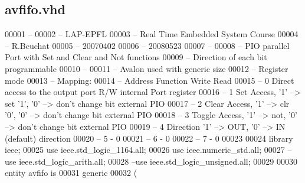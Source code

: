 \subsection{avfifo.\+vhd}
\label{ip_2avfifo_2avfifo_8vhd_source}

\begin{DoxyCode}
00001 \textcolor{keyword}{--}
00002 \textcolor{keyword}{-- LAP-EPFL}
00003 \textcolor{keyword}{-- Real Time Embedded System Course}
00004 \textcolor{keyword}{-- R.Beuchat}
00005 \textcolor{keyword}{-- 20070402}
00006 \textcolor{keyword}{-- 20080523}
00007 \textcolor{keyword}{--}
00008 \textcolor{keyword}{-- PIO parallel Port with Set and Clear and Not functions}
00009 \textcolor{keyword}{-- Direction of each bit programmable}
00010 \textcolor{keyword}{--}
00011 \textcolor{keyword}{-- Avalon used with generic size}
00012 \textcolor{keyword}{-- Register mode}
00013 \textcolor{keyword}{-- Mapping:}
00014 \textcolor{keyword}{-- Address  Function Write                                              Read}
00015 \textcolor{keyword}{-- 0        Direct access to the output port    R/W                     internal Port register}
00016 \textcolor{keyword}{-- 1        Set Access,    '1' --> set '1', '0' --> don't change bit    external PIO}
00017 \textcolor{keyword}{-- 2        Clear Access,  '1' --> clr '0', '0' --> don't change bit    external PIO}
00018 \textcolor{keyword}{-- 3        Toggle Access, '1' --> not,     '0' --> don't change bit    external PIO}
00019 \textcolor{keyword}{-- 4        Direction      '1' --> OUT,     '0' --> IN (default)        direction}
00020 \textcolor{keyword}{-- 5        -                                                           0}
00021 \textcolor{keyword}{-- 6        -                                                           0}
00022 \textcolor{keyword}{-- 7        -                                                           0}
00023 
00024 \textcolor{vhdlkeyword}{library }\textcolor{keywordflow}{ieee};
00025 \textcolor{vhdlkeyword}{use }ieee.std\_logic\_1164.\textcolor{keywordflow}{all};
00026 \textcolor{vhdlkeyword}{use }ieee.numeric\_std.\textcolor{keywordflow}{all};
00027 \textcolor{keyword}{--use ieee.std\_logic\_arith.all;}
00028 \textcolor{keyword}{--use ieee.std\_logic\_unsigned.all;}
00029 
00030 \textcolor{keywordflow}{entity }avfifo \textcolor{keywordflow}{is}
00031     \textcolor{keywordflow}{generic}
00032     \textcolor{vhdlchar}{(}

\end{DoxyCode}
